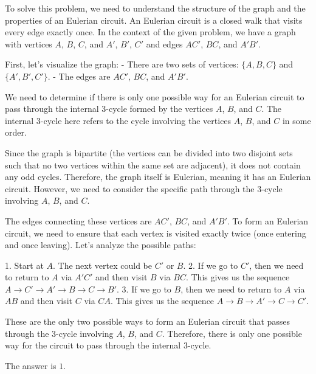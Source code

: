 To solve this problem, we need to understand the structure of the graph and the properties of an Eulerian circuit. An Eulerian circuit is a closed walk that visits every edge exactly once. In the context of the given problem, we have a graph with vertices \(A\), \(B\), \(C\), and \(A'\), \(B'\), \(C'\) and edges \(AC'\), \(BC\), and \(A'B'\).

First, let's visualize the graph:
- There are two sets of vertices: \(\{A, B, C\}\) and \(\{A', B', C'\}\).
- The edges are \(AC'\), \(BC\), and \(A'B'\).

We need to determine if there is only one possible way for an Eulerian circuit to pass through the internal 3-cycle formed by the vertices \(A\), \(B\), and \(C\). The internal 3-cycle here refers to the cycle involving the vertices \(A\), \(B\), and \(C\) in some order.

Since the graph is bipartite (the vertices can be divided into two disjoint sets such that no two vertices within the same set are adjacent), it does not contain any odd cycles. Therefore, the graph itself is Eulerian, meaning it has an Eulerian circuit. However, we need to consider the specific path through the 3-cycle involving \(A\), \(B\), and \(C\).

The edges connecting these vertices are \(AC'\), \(BC\), and \(A'B'\). To form an Eulerian circuit, we need to ensure that each vertex is visited exactly twice (once entering and once leaving). Let's analyze the possible paths:

1. Start at \(A\). The next vertex could be \(C'\) or \(B\).
2. If we go to \(C'\), then we need to return to \(A\) via \(A'C'\) and then visit \(B\) via \(BC\). This gives us the sequence \(A \to C' \to A' \to B \to C \to B'\).
3. If we go to \(B\), then we need to return to \(A\) via \(AB\) and then visit \(C\) via \(CA\). This gives us the sequence \(A \to B \to A' \to C \to C'\).

These are the only two possible ways to form an Eulerian circuit that passes through the 3-cycle involving \(A\), \(B\), and \(C\). Therefore, there is only one possible way for the circuit to pass through the internal 3-cycle.

The answer is \(\boxed{1}\).